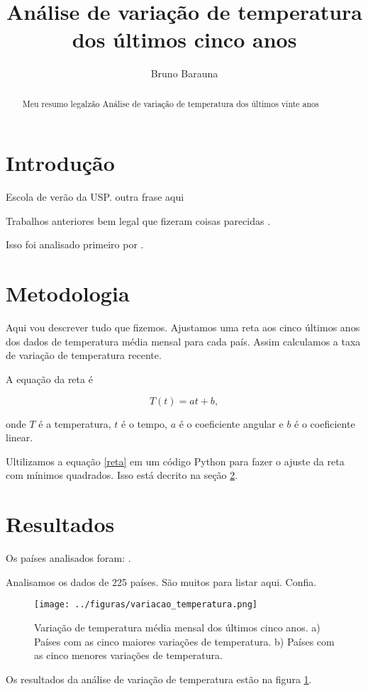 \documentclass{article}
\newcommand{\Title}{Análise de variação de temperatura dos últimos vinte anos}
\begin{document}
\title{Análise de variação de temperatura dos últimos cinco anos}
\author{Bruno Barauna}
\maketitle

\begin{abstract}
Meu resumo legalzão \Title
\end{abstract}

\section{Introdução}

Escola de verão da USP.
outra frase aqui

Trabalhos anteriores bem legal que fizeram coisas parecidas
\citep{Hansen2010}.

Isso foi analisado primeiro por \citet{Hansen2010}.

\section{Metodologia}
\label{sec:metodos}
Aqui vou descrever tudo que fizemos.
Ajustamos uma reta aos cinco últimos anos dos dados
de temperatura média mensal para cada país.
Assim calculamos a taxa de variação de temperatura recente.

A equação da reta é

\begin{equation}
T(t) = a t +b,
\label{eq:reta}
\end{equation}

\noindent
onde $T$ é a temperatura, $t$ é o tempo, $a$ é o coeficiente angular e $b$ é o coeficiente linear.

Ultilizamos a equação \ref{reta} em um código Python para fazer o ajuste da 
reta com mínimos quadrados.
Isso está decrito na seção \ref{sec:metodos}.

\section{Resultados}
\label{sec:resultados}

Os países analisados foram: \Paises.

Analisamos os dados de 225 países. São muitos para listar aqui. Confia.
\begin{figure}[!htb]
	\centering
	\texttt{[image: ../figuras/variacao\_temperatura.png]}
	\caption{
		Variação de temperatura média mensal dos últimos cinco anos.
		a) Países com as cinco maiores variações de temperatura.
		b) Países com as cinco menores variações de temperatura.
	}
	\label{fig:variacoes}
\end{figure}

Os resultados da análise de variação de temperatura estão na figura \ref{fig:variacoes}.



\end{document}
